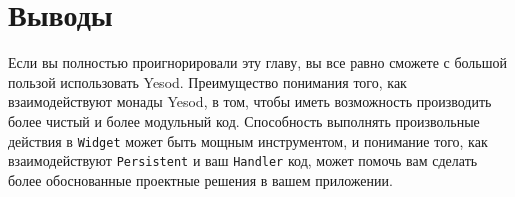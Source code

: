 \section{Выводы}

Если вы полностью проигнорировали эту главу, вы все равно сможете с большой пользой 
использовать Yesod. Преимущество понимания того, как взаимодействуют монады Yesod, в том,
чтобы иметь возможность производить более чистый и более модульный код. Способность
выполнять произвольные действия в \lstinline'Widget' может быть мощным инструментом, и
понимание того, как взаимодействуют \lstinline'Persistent' и ваш \lstinline'Handler' код,
может помочь вам сделать более обоснованные проектные решения в вашем приложении.
